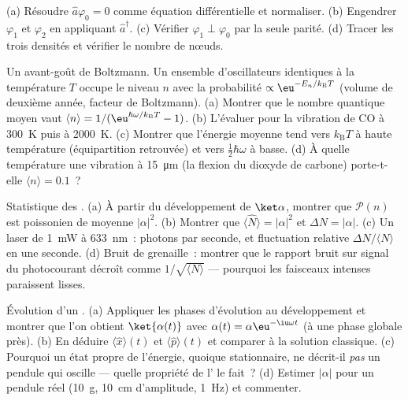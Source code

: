 \begin{exercise}[$\star\star$]\label{exo:b3:harmonic-oscillator:5}
(a) Résoudre $\hat a\varphi_0 = 0$ comme équation différentielle et
normaliser. (b) Engendrer $\varphi_1$ et $\varphi_2$ en appliquant
$\hat a^\dagger$. (c) Vérifier $\varphi_1 \perp \varphi_0$ par la seule
parité. (d) Tracer les trois densités et vérifier le nombre de nœuds.
\end{exercise}

\begin{exercise}[$\star\star$]\label{exo:b3:harmonic-oscillator:6}
Un avant-goût de Boltzmann. Un ensemble d'oscillateurs identiques à la
température $T$ occupe le niveau $n$ avec la probabilité $\propto
\eu^{-E_n/k_{\text{B}}T}$ (volume de deuxième année, facteur de
Boltzmann). (a) Montrer que le nombre quantique moyen vaut $\langle n\rangle =
1/(\eu^{\hbar\omega/k_{\text{B}}T} - 1)$. (b) L'évaluer pour la
vibration de CO à \qty{300}{K} puis à \qty{2000}{K}. (c) Montrer que
l'énergie moyenne tend vers $k_{\text{B}}T$ à haute température
(équipartition retrouvée) et vers $\tfrac12\hbar\omega$ à basse. (d) À
quelle température une vibration à \qty{15}{\micro m} (la flexion du
dioxyde de carbone) porte-t-elle $\langle n\rangle = 0.1$~?
\end{exercise}

\begin{exercise}[$\star\star$]\label{exo:b3:harmonic-oscillator:7}
Statistique des . (a) À partir du développement de
$\ket\alpha$, montrer que $\mathcal P(n)$ est poissonien de moyenne
$|\alpha|^2$. (b) Montrer que $\langle\hat N\rangle = |\alpha|^2$ et
$\Delta N = |\alpha|$. (c) Un laser de \qty{1}{mW} à \qty{633}{nm}~:
photons par seconde, et fluctuation relative
$\Delta N/\langle N\rangle$ en une seconde. (d) Bruit de grenaille~:
montrer que le rapport bruit sur signal du photocourant décroît comme
$1/\sqrt{\langle N\rangle}$ --- pourquoi les faisceaux intenses
paraissent lisses.
\end{exercise}

\begin{exercise}[$\star\star$]\label{exo:b3:harmonic-oscillator:8}
Évolution d'un . (a) Appliquer les phases d'évolution au
développement et montrer que l'on obtient $\ket{\alpha(t)}$ avec $\alpha(t) =
\alpha\eu^{-\iu\omega t}$ (à une phase globale près). (b) En déduire
$\langle\hat x\rangle(t)$ et $\langle\hat p\rangle(t)$ et comparer à la
solution classique. (c) Pourquoi un état propre de l'énergie, quoique
stationnaire, ne décrit-il \emph{pas} un pendule qui oscille --- quelle
propriété de l' le fait~? (d) Estimer $|\alpha|$ pour un
pendule réel (\qty{10}{g}, \qty{10}{cm} d'amplitude, \qty{1}{Hz}) et
commenter.
\end{exercise}

